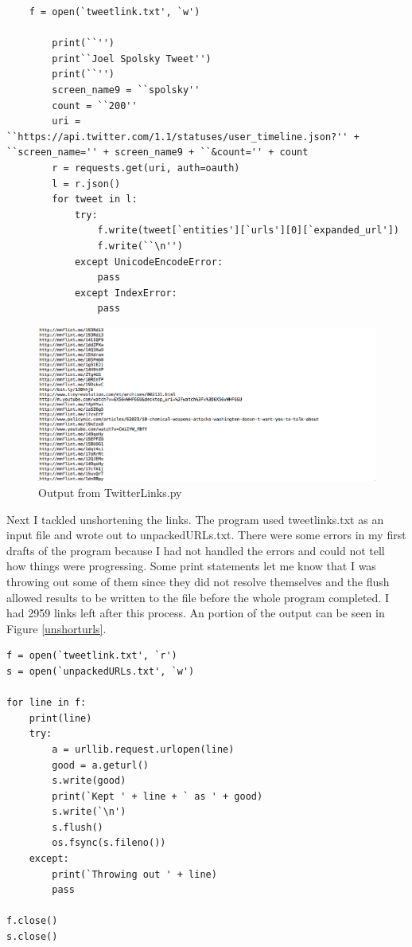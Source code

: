 \documentclass{article}
\begin{document}
\begin{lstlisting}
	f = open(`tweetlink.txt', `w')

        print(``'')
        print``Joel Spolsky Tweet'')
        print(``'')
        screen_name9 = ``spolsky''
        count = ``200''
        uri = ``https://api.twitter.com/1.1/statuses/user_timeline.json?'' + ``screen_name='' + screen_name9 + ``&count='' + count
        r = requests.get(uri, auth=oauth)
        l = r.json()
        for tweet in l:
            try:
                f.write(tweet[`entities'][`urls'][0][`expanded_url'])
                f.write(``\n'')
            except UnicodeEncodeError:
                pass
            except IndexError:
                pass
\end{lstlisting}

\begin{figure}[H]
\centering
\includegraphics[scale=0.25]{q1/shortened}
\caption{Output from TwitterLinks.py}
\label{shorturls}
\end{figure}

Next I tackled unshortening the links. The program used tweetlinks.txt as an input file and wrote out to unpackedURLs.txt. There were some errors in my first drafts of the program because I had not handled the errors and could not tell how things were progressing. Some print statements let me know that I was throwing out some of them since they did not resolve themselves and the flush allowed results to be written to the file before the whole program completed. I had 2959 links left after this process. An portion of the output can be seen in Figure \ref{unshorturls}.

\begin{lstlisting}
f = open(`tweetlink.txt', `r')
s = open(`unpackedURLs.txt', `w')

for line in f:
    print(line)
    try:
        a = urllib.request.urlopen(line)
        good = a.geturl()
        s.write(good)
        print(`Kept ' + line + ` as ' + good)
        s.write(`\n')
        s.flush()
        os.fsync(s.fileno())
    except:
        print(`Throwing out ' + line)
        pass

f.close()
s.close()
\end{lstlisting}
\end{document}
